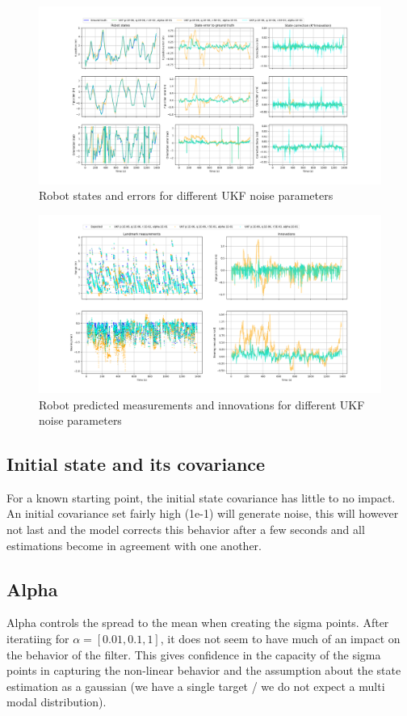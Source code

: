 \documentclass{article}
\begin{document}
\begin{figure}
\centering
\includegraphics[width=\textwidth]{Figure_7.png}
\caption{Robot states and errors for different UKF noise parameters}
\label{fig:figure7}
\end{figure}

\begin{figure}
\centering
\includegraphics[width=\textwidth]{Figure_8.png}
\caption{Robot predicted measurements and innovations for different UKF noise parameters}
\label{fig:figure8}
\end{figure}

\subsection{Initial state and its covariance}
For a known starting point, the initial state covariance has little to no impact. An initial covariance set fairly high (1e-1) will generate noise, this will however not last and the model corrects this behavior after a few seconds and all estimations become in agreement with one another.

\subsection{Alpha}
Alpha controls the spread to the mean when creating the sigma points. After iteratiing for $\alpha=[0.01, 0.1, 1]$, it does not seem to have much of an impact on the behavior of the filter. This gives confidence in the capacity of the sigma points in capturing the non-linear behavior and the assumption about the state estimation as a gaussian (we have a single target / we do not expect a multi modal distribution).
\end{document}
